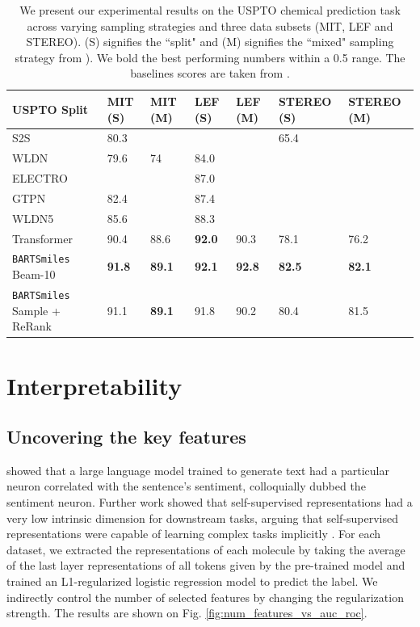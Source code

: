 \documentclass{article} %
\newcommand{\MODEL}{\texttt{BARTSmiles}}
\begin{document}
\begin{table}[h]
\scriptsize
\centering
\begin{tabular}{@{}lllllll@{}}
\toprule
USPTO Split       & MIT (S)  & MIT (M) & LEF (S)  & LEF (M) & STEREO (S) & STEREO (M) \\ \midrule
S2S \citep{reaction-prediction-seq2seq}     & 80.3 &     &      &     & 65.4   &        \\
WLDN \citep{jin2017predicting}    & 79.6 & 74  & 84.0 &     &        &        \\
ELECTRO \citep{bradshaw2018generative} &      &     & 87.0 &     &        &        \\
GTPN \citep{do2019graph}    & 82.4 &     & 87.4 &     &        &        \\
WLDN5 \citep{coley2019graph}   & 85.6 &     & 88.3 &     &        &        \\
Transformer \citep{molecular-transformer}     & 90.4 & 88.6  & \textbf{92.0} & 90.3  & 78.1 & 76.2 \\ \midrule
\MODEL{} Beam-10 & \textbf{91.8} & \textbf{89.1} & \textbf{92.1} & \textbf{92.8} & \textbf{82.5} & \textbf{82.1}\\
\MODEL{} Sample + ReRank & 91.1 & \textbf{89.1} & 91.8 & 90.2 & 80.4 & 81.5 \\\bottomrule
\end{tabular}
\caption{We present our experimental results on the USPTO chemical prediction task across varying sampling strategies and three data subsets (MIT, LEF and STEREO). (S) signifies the ``split" and (M) signifies the ``mixed" sampling strategy from \citet{molecular-transformer}). We bold the best performing numbers within a 0.5 range. The baselines scores are taken from \citet{molecular-transformer}. }\label{table:chemical_reaction_prediction}
\end{table}



\section{Interpretability}




\subsection{Uncovering the key features}
\citet{radford2017learning} showed that a large language model trained to generate text had a particular neuron correlated with the sentence's sentiment, colloquially dubbed the sentiment neuron.  Further work showed that self-supervised representations had a very low intrinsic dimension for downstream tasks, arguing that self-supervised representations were capable of learning complex tasks implicitly \citep{intrinsic_dimensionality_finetuning}. For each dataset, we extracted the representations of each molecule by taking the average of the last layer representations of all tokens given by the pre-trained model and trained an L1-regularized logistic regression model to predict the label. We indirectly control the number of selected features by changing the regularization strength. The results are shown on Fig. \ref{fig:num_features_vs_auc_roc}. %
\end{document}
